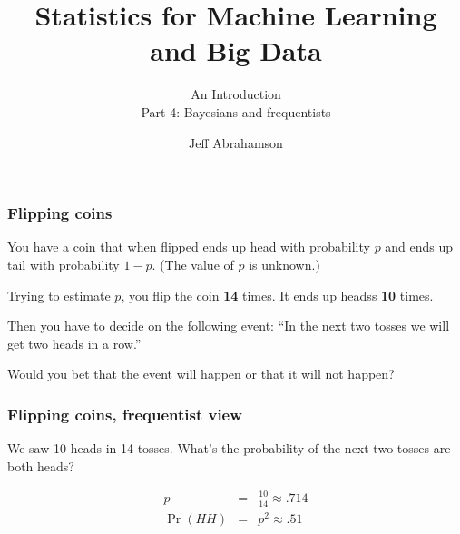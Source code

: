 \documentclass[t]{beamer}
\title
{Statistics for Machine Learning and Big Data}
\subtitle{An Introduction\\[6mm] Part 4: Bayesians and frequentists}
\author[Abrahamson] {Jeff Abrahamson}
\begin{document}
\begin{frame}
  \titlepage
\end{frame}


\begin{frame}
  \frametitle{Flipping coins}

  You have a coin that when flipped ends up head with probability $p$
  and ends up tail with probability $1-p$. (The value of $p$ is
  unknown.)

  Trying to estimate $p$, you flip the coin \textbf{14} times. It ends
  up headss \textbf{10} times.

  Then you have to decide on the following event: ``In the next two
  tosses we will get two heads in a row.''

  Would you bet that the event will happen or that it will not happen?

  \vfill

  \note{

  }
\end{frame}

\begin{frame}
  \frametitle{Flipping coins, frequentist view}

  We saw 10 heads in 14 tosses.  What's the probability of the next two tosses are both heads?

  \begin{eqnarray*}
    p & = & \frac{10}{14} \approx .714\\[5mm]
    \Pr(HH) & = & p^2 \approx .51
  \end{eqnarray*}

\end{frame}

\end{document}
